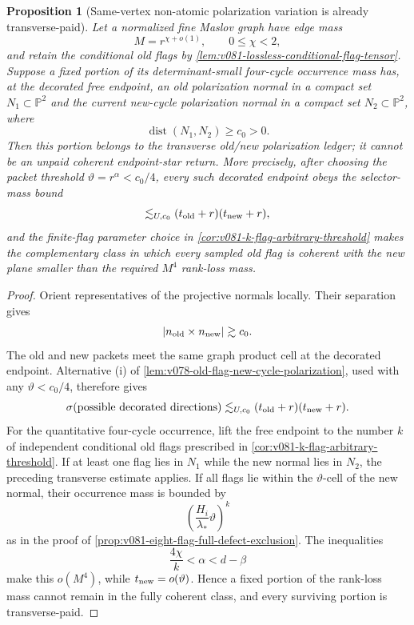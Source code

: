 \documentclass[10pt]{article}
\newtheorem{proposition}[theorem]{Proposition}
\newcommand{\dist}{\operatorname{dist}}
\begin{document}
\begin{proposition}[Same-vertex non-atomic polarization variation is already transverse-paid]
\label{prop:v081-same-vertex-polarization-variation-paid}
Let a normalized fine Maslov graph have edge mass
\[
M=r^{\chi+o(1)},
\qquad
0\le\chi<2,
\]
and retain the conditional old flags by
\cref{lem:v081-lossless-conditional-flag-tensor}.  Suppose a fixed portion of its determinant-small
four-cycle occurrence mass has, at the decorated free endpoint, an old polarization normal in a
compact set \(N_1\subset\mathbb P^2\) and the current new-cycle polarization normal in a compact set
\(N_2\subset\mathbb P^2\), where
\[
\dist(N_1,N_2)\ge c_0>0.
\]
Then this portion belongs to the transverse old/new polarization ledger; it cannot be an unpaid
coherent endpoint-star return.  More precisely, after choosing the packet threshold
\(\vartheta=r^\alpha<c_0/4\), every such decorated endpoint obeys the selector-mass bound
\[
\lesssim_{U,c_0}
(t_{\rm old}+r)(t_{\rm new}+r),
\]
and the finite-flag parameter choice in
\cref{cor:v081-k-flag-arbitrary-threshold} makes the complementary class in which every sampled old
flag is coherent with the new plane smaller than the required \(M^4\) rank-loss mass.
\end{proposition}

\begin{proof}
Orient representatives of the projective normals locally.  Their separation gives
\[
|n_{\rm old}\times n_{\rm new}|
\gtrsim c_0.
\]
The old and new packets meet the same graph product cell at the decorated endpoint.  Alternative
\textnormal{(i)} of
\cref{lem:v078-old-flag-new-cycle-polarization}, used with any
\(\vartheta<c_0/4\), therefore gives
\[
\sigma(\text{possible decorated directions})
\lesssim_{U,c_0}
(t_{\rm old}+r)(t_{\rm new}+r).
\]
For the quantitative four-cycle occurrence, lift the free endpoint to the number \(k\) of
independent conditional old flags prescribed in
\cref{cor:v081-k-flag-arbitrary-threshold}.  If at least one flag lies in \(N_1\) while the new
normal lies in \(N_2\), the preceding transverse estimate applies.  If all flags lie within the
\(\vartheta\)-cell of the new normal, their occurrence mass is bounded by
\[
\left(\frac{H_i}{\lambda_*}\vartheta\right)^k
\]
as in the proof of
\cref{prop:v081-eight-flag-full-defect-exclusion}.  The inequalities
\[
\frac{4\chi}{k}<\alpha<d-\beta
\]
make this \(o(M^4)\), while
\(t_{\rm new}=o(\vartheta)\).  Hence a fixed portion of the rank-loss mass cannot remain in the
fully coherent class, and every surviving portion is transverse-paid.
\end{proof}
\end{document}
